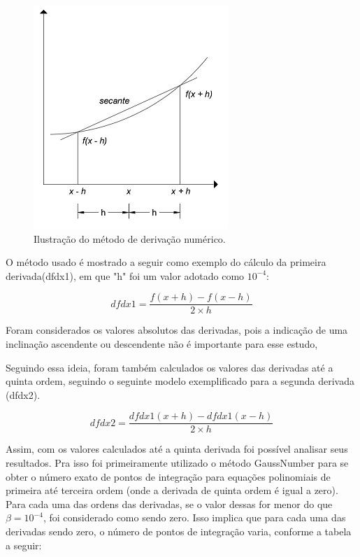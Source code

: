 \documentclass[12pt,a4paper]{article}
\begin{document}
\begin{figure}[h]
\begin{center}
\includegraphics{images/derivative}
\end{center}
\caption{Ilustração do método de derivação numérico.}
\end{figure}



O método usado é mostrado a seguir como exemplo do cálculo da primeira derivada(dfdx1), em que "h" foi um valor adotado como $10^{-4}$:

\begin{equation}
dfdx1=\frac{f(x+h)-f(x-h)}{2\times h}
\end{equation}

Foram considerados os valores absolutos das derivadas, pois a indicação de uma inclinação ascendente ou descendente não é importante para esse estudo,

Seguindo essa ideia, foram também calculados os valores das derivadas até a quinta ordem, seguindo o seguinte modelo exemplificado para a segunda derivada (dfdx2).

\begin{equation}
dfdx2=\frac{dfdx1(x+h)-dfdx1(x-h)}{2\times h}
\end{equation}

Assim, com os valores calculados até a quinta derivada foi possível analisar seus resultados. Pra isso foi primeiramente utilizado o método GaussNumber para se obter o número exato de pontos de integração para equações polinomiais de primeira até terceira ordem (onde a derivada de quinta ordem é igual a zero). Para cada uma das ordens das derivadas, se o valor dessas for menor do que $\beta = 10^{-4}$, foi considerado como sendo zero. Isso implica que para cada uma das derivadas sendo zero, o número de pontos de integração varia, conforme a tabela a seguir:
\end{document}
